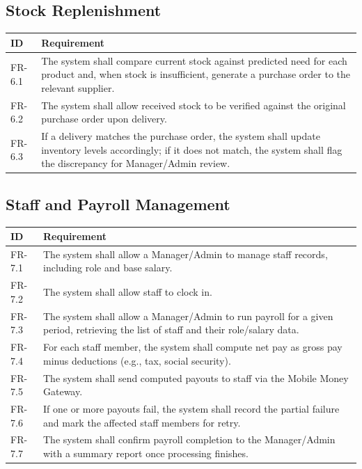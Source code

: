 \documentclass[11pt,a4paper]{report}
\begin{document}
\subsection{Stock Replenishment}
\begin{longtable}{p{1.6cm} L{11.4cm}}
\toprule
\textbf{ID} & \textbf{Requirement} \\
\midrule
\endhead
FR-6.1 & The system shall compare current stock against predicted need for each product and, when stock is insufficient, generate a purchase order to the relevant supplier. \\
FR-6.2 & The system shall allow received stock to be verified against the original purchase order upon delivery. \\
FR-6.3 & If a delivery matches the purchase order, the system shall update inventory levels accordingly; if it does not match, the system shall flag the discrepancy for Manager/Admin review. \\
\bottomrule
\end{longtable}

\subsection{Staff and Payroll Management}
\begin{longtable}{p{1.6cm} L{11.4cm}}
\toprule
\textbf{ID} & \textbf{Requirement} \\
\midrule
\endhead
FR-7.1 & The system shall allow a Manager/Admin to manage staff records, including role and base salary. \\
FR-7.2 & The system shall allow staff to clock in. \\
FR-7.3 & The system shall allow a Manager/Admin to run payroll for a given period, retrieving the list of staff and their role/salary data. \\
FR-7.4 & For each staff member, the system shall compute net pay as gross pay minus deductions (e.g., tax, social security). \\
FR-7.5 & The system shall send computed payouts to staff via the Mobile Money Gateway. \\
FR-7.6 & If one or more payouts fail, the system shall record the partial failure and mark the affected staff members for retry. \\
FR-7.7 & The system shall confirm payroll completion to the Manager/Admin with a summary report once processing finishes. \\
\bottomrule
\end{longtable}
\end{document}

